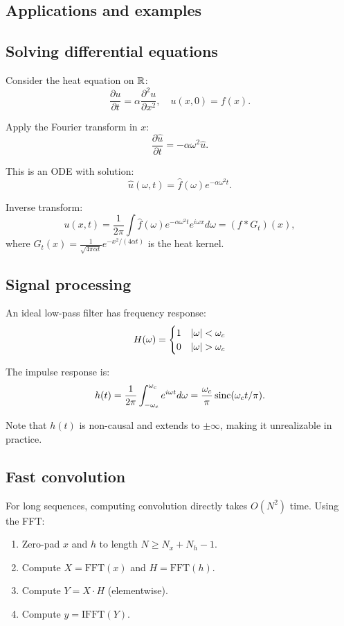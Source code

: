 \begin{notechapter}
\section{Applications and examples}

\subsection{Solving differential equations}

\begin{example}
Consider the heat equation on $\mathbb{R}$:
\[
\frac{\partial u}{\partial t} = \alpha \frac{\partial^2 u}{\partial x^2}, \quad u(x, 0) = f(x).
\]

Apply the Fourier transform in $x$:
\[
\frac{\partial \hat{u}}{\partial t} = -\alpha \omega^2 \hat{u}.
\]

This is an ODE with solution:
\[
\hat{u}(\omega, t) = \hat{f}(\omega) e^{-\alpha \omega^2 t}.
\]

Inverse transform:
\[
u(x, t) = \frac{1}{2\pi} \int \hat{f}(\omega) e^{-\alpha \omega^2 t} e^{i\omega x} d\omega = (f * G_t)(x),
\]
where $G_t(x) = \frac{1}{\sqrt{4\pi \alpha t}} e^{-x^2/(4\alpha t)}$ is the heat kernel.
\end{example}

\subsection{Signal processing}

\begin{example}
An ideal low-pass filter has frequency response:
\[
H(\omega) = \begin{cases}
1 & \left|\omega\right| < \omega_c \\
0 & \left|\omega\right| > \omega_c
\end{cases}
\]

The impulse response is:
\[
h(t) = \frac{1}{2\pi} \int_{-\omega_c}^{\omega_c} e^{i\omega t} d\omega = \frac{\omega_c}{\pi} \operatorname{sinc}(\omega_c t/\pi).
\]

Note that $h(t)$ is non-causal and extends to $\pm \infty$, making it unrealizable in practice.
\end{example}

\subsection{Fast convolution}

For long sequences, computing convolution directly takes $O(N^2)$ time. Using the FFT:
\begin{enumerate}
\item Zero-pad $x$ and $h$ to length $N \geq N_x + N_h - 1$.
\item Compute $X = \text{FFT}(x)$ and $H = \text{FFT}(h)$.
\item Compute $Y = X \cdot H$ (elementwise).
\item Compute $y = \text{IFFT}(Y)$.
\end{enumerate}


\end{notechapter}
